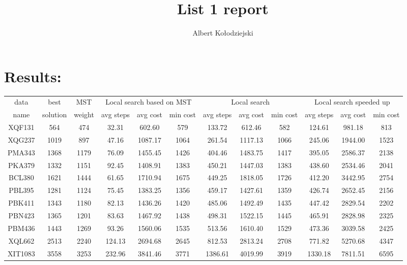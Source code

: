 \documentclass{article}
\title{List 1 report}
\author{Albert Kołodziejski}
\begin{document}
\maketitle
\section*{Results:}
\small
\begin{center}
    \begin{tabular}{| c | c | c || c | c | c || c | c | c || c | c | c ||}
        \hline
        data & best & MST & \multicolumn{3}{c||}{Local search based on MST} & \multicolumn{3}{c||}{Local search} & \multicolumn{3}{c||}{Local search speeded up}\\ 
        \cline{4-12}
        name & solution & weight & avg steps & avg cost & min cost & avg steps & avg cost & min cost & avg steps & avg cost & min cost\\
        \hline
        \hline
        XQF131 & 564 & 474 & 32.31 & 602.60 & 579 & 133.72 & 612.46 & 582 & 124.61 & 981.18 & 813\\
        \hline
        XQG237 & 1019  & 897 & 47.16 & 1087.17 & 1064 & 261.54 & 1117.13 & 1066 & 245.06 & 1944.00 & 1523\\
        \hline
        PMA343 & 1368  & 1179 & 76.09 & 1455.45 & 1426 & 404.46 & 1483.75 & 1417 & 395.05 & 2586.37 & 2138\\
        \hline
        PKA379 & 1332 & 1151 & 92.45 & 1408.91 & 1383 & 450.21 & 1447.03 & 1383 & 438.60 & 2534.46 & 2041\\
        \hline
        BCL380 & 1621 & 1444 & 61.65 & 1710.94 & 1675 & 449.25 & 1818.05 & 1726 & 412.20 & 3442.95 & 2754\\
        \hline
        PBL395 & 1281 & 1124 & 75.45 & 1383.25 & 1356 & 459.17 & 1427.61 & 1359 & 426.74 & 2652.45 & 2156\\
        \hline
        PBK411 & 1343 & 1180 & 82.13 & 1436.26 & 1420 & 485.06 & 1492.49 & 1435 & 447.42 & 2829.54 & 2202\\
        \hline
        PBN423 & 1365 & 1201 & 83.63 & 1467.92 & 1438 & 498.31 & 1522.15 & 1445 & 465.91 & 2828.98 & 2325\\
        \hline
        PBM436 & 1443 & 1269 & 93.26 & 1560.06 & 1535 & 513.56 & 1610.40 & 1529 & 473.36 & 3039.58 & 2425\\
        \hline
        XQL662 & 2513 & 2240 & 124.13 & 2694.68 & 2645 & 812.53 & 2813.24 & 2708 & 771.82 & 5270.68 & 4347\\
        \hline
        XIT1083 & 3558 & 3253 & 232.96 & 3841.46 & 3771 & 1386.61 & 4019.99 & 3919 & 1330.18 & 7811.51 & 6595 \\

\end{tabular}
\end{center}
\end{document}
